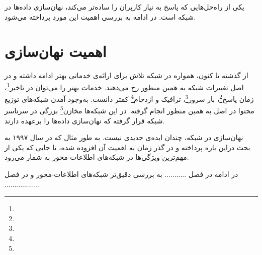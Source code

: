 یکی از راه‌حل‌هایی که پاسخ به نیاز کاربران را ساده‌تر می‌کند، نهان‌سازی داده‌ها در شبکه است. در ادامه به بررسی اهمیت این مورد پرداخته می‌شود.


\section{اهمیت نهان‌سازی}
از گذشته تا کنون، همواره در شبکه تلاش برای ارائه‌ی خدماتی بهتر ادامه داشته و در اصل تغییرات شبکه به همین منظور رخ می‌دهند. خدمات بهتر را می‌توان در تاخیر\footnote{}، زمان پاسخ\footnote{}، بار سرور\footnote{}، ترافیک و ازدحام\footnote{} کمتر دانست. به‌وجود آمدن شبکه‌های توزیع محتوا در اصل به همین منظور انجام گرفته. در این شبکه‌ها مخازن\footnote{} بزرگی در سرتاسر شبکه قرار گرفته که نهان‌سازی داده‌ها را برعهده دارند.

نهان‌سازی در شبکه، چندان ایده‌ی جدیدی نیست. به طور مثال \cite{adaptive_web_caching} که در سال ۱۹۹۷ به بحث دراین باره پرداخته‌ و در گذر زمان به اهمیت آن افزوده شده، تا جایی که یکی از مهم‌ترین ویژگی‌ها در شبکه‌های اطلاعات-محور به شمار می‌رود.



در ادامه در فصل ........... به بررسی دقیق‌تر شبکه‌های اطلاعات-محور و در فصل ..................



